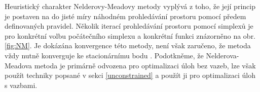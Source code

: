 Heuristický charakter Nelderovy-Meadovy metody vyplývá z toho, že její princip je postaven na do jisté míry náhodném prohledávání prostoru pomocí předem definovaných pravidel. Několik iterací prohledávání prostoru pomocí simplexů je pro konkrétní volbu počátečního simplexu a konkrétní funkci znázorněno na obr. \ref{fig:NM}. Je dokázána konvergence této metody, není však zaručeno, že metoda vždy nutně konverguje ke stacionárnímu bodu \cite{BBO-textbook}. Podotkněme, že Nelderova-Meadova metoda je primárně odvozena pro optimalizaci úloh bez vazeb, lze však použít techniky popsané v sekci \ref{unconstrained} a použít ji pro optimalizaci úloh s vazbami.


